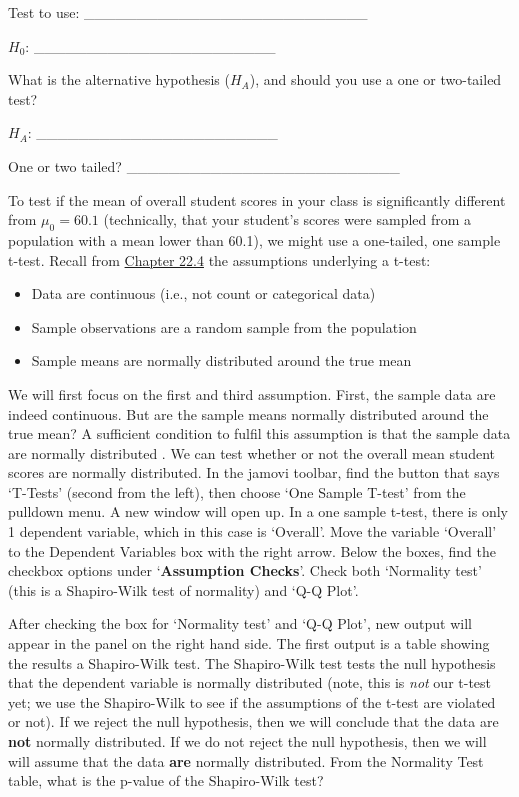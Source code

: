 \documentclass[
  openany]{scrbook}
\providecommand{\tightlist}{%
  \setlength{\itemsep}{0pt}\setlength{\parskip}{0pt}}
\begin{document}
Test to use: \_\_\_\_\_\_\_\_\_\_\_\_\_\_\_\_\_\_\_\_\_\_\_\_\_\_\_

\(H_{0}\): \_\_\_\_\_\_\_\_\_\_\_\_\_\_\_\_\_\_\_\_\_\_\_

What is the alternative hypothesis (\(H_{A}\)), and should you use a one or two-tailed test?

\(H_{A}\): \_\_\_\_\_\_\_\_\_\_\_\_\_\_\_\_\_\_\_\_\_\_\_

One or two tailed? \_\_\_\_\_\_\_\_\_\_\_\_\_\_\_\_\_\_\_\_\_\_\_\_\_\_

To test if the mean of overall student scores in your class is significantly different from \(\mu_{0} = 60.1\) (technically, that your student's scores were sampled from a population with a mean lower than 60.1), we might use a one-tailed, one sample t-test.
Recall from \protect\hyperlink{assumptions-of-t-tests}{Chapter 22.4} the assumptions underlying a t-test:

\begin{itemize}
\tightlist
\item
  Data are continuous (i.e., not count or categorical data)
\item
  Sample observations are a random sample from the population
\item
  Sample means are normally distributed around the true mean
\end{itemize}

We will first focus on the first and third assumption.
First, the sample data are indeed continuous.
But are the sample means normally distributed around the true mean?
A sufficient condition to fulfil this assumption is that the sample data are normally distributed \citep{Johnson1995, Lumley2002}.
We can test whether or not the overall mean student scores are normally distributed.
In the jamovi toolbar, find the button that says `T-Tests' (second from the left), then choose `One Sample T-test' from the pulldown menu.
A new window will open up.
In a one sample t-test, there is only 1 dependent variable, which in this case is `Overall'.
Move the variable `Overall' to the Dependent Variables box with the right arrow.
Below the boxes, find the checkbox options under `\textbf{Assumption Checks}'.
Check both `Normality test' (this is a Shapiro-Wilk test of normality) and `Q-Q Plot'.

After checking the box for `Normality test' and `Q-Q Plot', new output will appear in the panel on the right hand side.
The first output is a table showing the results a Shapiro-Wilk test.
The Shapiro-Wilk test tests the null hypothesis that the dependent variable is normally distributed (note, this is \emph{not} our t-test yet; we use the Shapiro-Wilk to see if the assumptions of the t-test are violated or not).
If we reject the null hypothesis, then we will conclude that the data are \textbf{not} normally distributed.
If we do not reject the null hypothesis, then we will will assume that the data \textbf{are} normally distributed.
From the Normality Test table, what is the p-value of the Shapiro-Wilk test?
\end{document}
